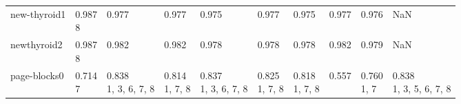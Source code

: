 \begin{tabular}{llllllllll}
new-thyroid1           &     \makecell{0.987 \\ \scriptsize{8}} &               \makecell{0.977 \\ \scriptsize{}} &         \makecell{0.977 \\ \scriptsize{}} &               \makecell{0.975 \\ \scriptsize{}} &            \makecell{0.977 \\ \scriptsize{}} &               \makecell{0.975 \\ \scriptsize{}} &                  \makecell{0.977 \\ \scriptsize{}} &               \makecell{0.976 \\ \scriptsize{}} &                                                NaN \\
newthyroid2            &     \makecell{0.987 \\ \scriptsize{8}} &               \makecell{0.982 \\ \scriptsize{}} &         \makecell{0.982 \\ \scriptsize{}} &               \makecell{0.978 \\ \scriptsize{}} &            \makecell{0.978 \\ \scriptsize{}} &               \makecell{0.978 \\ \scriptsize{}} &                  \makecell{0.982 \\ \scriptsize{}} &               \makecell{0.979 \\ \scriptsize{}} &                                                NaN \\
page-blocks0           &     \makecell{0.714 \\ \scriptsize{7}} &  \makecell{0.838 \\ \scriptsize{1, 3, 6, 7, 8}} &  \makecell{0.814 \\ \scriptsize{1, 7, 8}} &  \makecell{0.837 \\ \scriptsize{1, 3, 6, 7, 8}} &     \makecell{0.825 \\ \scriptsize{1, 7, 8}} &        \makecell{0.818 \\ \scriptsize{1, 7, 8}} &                  \makecell{0.557 \\ \scriptsize{}} &           \makecell{0.760 \\ \scriptsize{1, 7}} &  \makecell{0.838 \\ \scriptsize{1, 3, 5, 6, 7, 8}} \\

\end{tabular}
